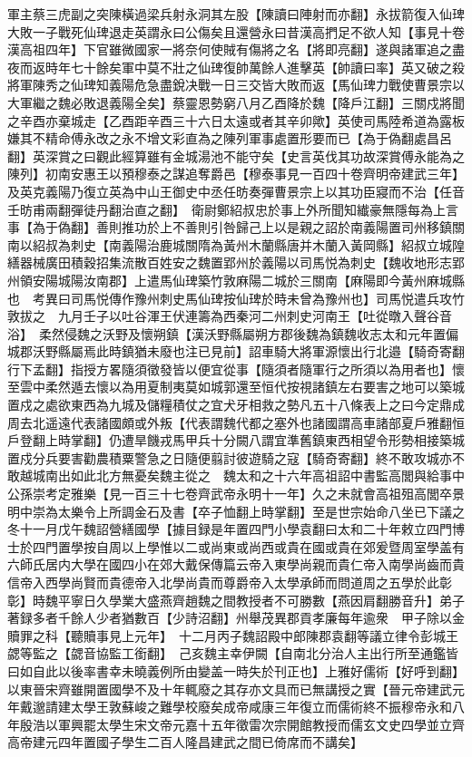 軍主蔡三虎副之突陳橫過梁兵射永洞其左股【陳讀曰陣射而亦翻】永拔箭復入仙琕大敗一子戰死仙琕退走英謂永曰公傷矣且還營永曰昔漢高捫足不欲人知【事見十卷漢高祖四年】下官雖微國家一將奈何使賊有傷將之名【將即亮翻】遂與諸軍追之盡夜而返時年七十餘矣軍中莫不壯之仙琕復帥萬餘人進擊英【帥讀曰率】英又破之殺將軍陳秀之仙琕知義陽危急盡銳决戰一日三交皆大敗而返【馬仙琕力戰使曹景宗以大軍繼之魏必敗退義陽全矣】蔡靈恩勢窮八月乙酉降於魏【降戶江翻】三關戍將聞之辛酉亦棄城走【乙酉距辛酉三十六日太遠或者其辛卯歟】英使司馬陸希道為露板嫌其不精命傅永改之永不增文彩直為之陳列軍事處置形要而已【為于偽翻處昌呂翻】英深賞之曰觀此經算雖有金城湯池不能守矣【史言英伐其功故深賞傅永能為之陳列】初南安惠王以預穆泰之謀追奪爵邑【穆泰事見一百四十卷齊明帝建武三年】及英克義陽乃復立英為中山王御史中丞任昉奏彈曹景宗上以其功臣寢而不治【任音壬昉甫兩翻彈徒丹翻治直之翻】　衛尉鄭紹叔忠於事上外所聞知纎豪無隱每為上言事【為于偽翻】善則推功於上不善則引咎歸己上以是親之詔於南義陽置司州移鎮關南以紹叔為刺史【南義陽治鹿城關隋為黃州木蘭縣唐并木蘭入黃岡縣】紹叔立城隍繕器械廣田積穀招集流散百姓安之魏置郢州於義陽以司馬悦為刺史【魏收地形志郢州領安陽城陽汝南郡】上遣馬仙琕築竹敦麻陽二城於三關南【麻陽即今黃州麻城縣也　考異曰司馬悦傳作豫州刺史馬仙琕按仙琕於時未曾為豫州也】司馬悦遣兵攻竹敦拔之　九月壬子以吐谷渾王伏連籌為西秦河二州刺史河南王【吐從暾入聲谷音浴】　柔然侵魏之沃野及懷朔鎮【漢沃野縣屬朔方郡後魏為鎮魏收志太和元年置偏城郡沃野縣屬焉此時鎮猶未廢也注已見前】詔車騎大將軍源懷出行北邉【騎奇寄翻行下孟翻】指授方畧隨須徵發皆以便宜從事【隨須者隨軍行之所須以為用者也】懷至雲中柔然遁去懷以為用夏制夷莫如城郭還至恒代按視諸鎮左右要害之地可以築城置戍之處欲東西為九城及儲糧積仗之宜犬牙相救之勢凡五十八條表上之曰今定鼎成周去北遥遠代表諸國頗或外叛【代表謂魏代都之塞外也諸國謂高車諸部夏戶雅翻恒戶登翻上時掌翻】仍遭旱饑戎馬甲兵十分闕八謂宜準舊鎮東西相望令形勢相接築城置戍分兵要害勸農積粟警急之日隨便翦討彼遊騎之寇【騎奇寄翻】終不敢攻城亦不敢越城南出如此北方無憂矣魏主從之　魏太和之十六年高祖詔中書監高閭與給事中公孫崇考定雅樂【見一百三十七卷齊武帝永明十一年】久之未就會高祖殂高閭卒景明中崇為太樂令上所調金石及書【卒子恤翻上時掌翻】至是世宗始命八坐已下議之　冬十一月戊午魏詔營繕國學【據目録是年置四門小學袁翻曰太和二十年敕立四門博士於四門置學按自周以上學惟以二或尚東或尚西或貴在國或貴在郊爰暨周室學盖有六師氏居内大學在國四小在郊大戴保傳篇云帝入東學尚親而貴仁帝入南學尚齒而貴信帝入西學尚賢而貴德帝入北學尚貴而尊爵帝入太學承師而問道周之五學於此彰彰】時魏平寧日久學業大盛燕齊趙魏之間教授者不可勝數【燕因肩翻勝音升】弟子著録多者千餘人少者猶數百【少詩沼翻】州舉茂異郡貢孝廉每年逾衆　甲子除以金贖罪之科【聽贖事見上元年】　十二月丙子魏詔殿中郎陳郡袁翻等議立律令彭城王勰等監之【勰音協監工銜翻】　己亥魏主幸伊闕【自南北分治人主出行所至通鑑皆曰如自此以後率書幸未曉義例所由變盖一時失於刊正也】上雅好儒術【好呼到翻】以東晉宋齊雖開置國學不及十年輒廢之其存亦文具而已無講授之實【晉元帝建武元年戴邈請建太學王敦蘇峻之難學校廢矣成帝咸康三年復立而儒術終不振穆帝永和八年殷浩以軍興罷太學生宋文帝元嘉十五年徵雷次宗開館教授而儒玄文史四學並立齊高帝建元四年置國子學生二百人隆昌建武之間已倚席而不講矣】

